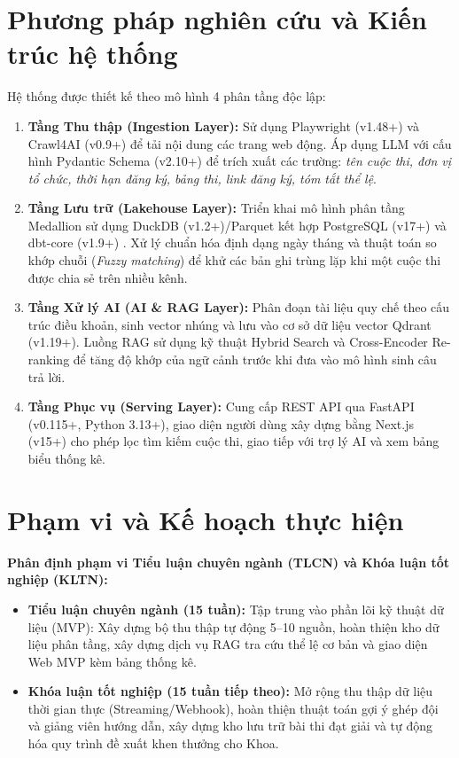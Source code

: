 \documentclass[11pt,a4paper]{article}
\begin{document}
\begin{enumerate}
\section{Phương pháp nghiên cứu và Kiến trúc hệ thống}
Hệ thống được thiết kế theo mô hình 4 phân tầng độc lập:
\begin{enumerate}
    \item \textbf{Tầng Thu thập (Ingestion Layer):} Sử dụng Playwright (v1.48+) và Crawl4AI (v0.9+) để tải nội dung các trang web động. Áp dụng LLM với cấu hình Pydantic Schema (v2.10+) để trích xuất các trường: \textit{tên cuộc thi, đơn vị tổ chức, thời hạn đăng ký, bảng thi, link đăng ký, tóm tắt thể lệ}.
    \item \textbf{Tầng Lưu trữ (Lakehouse Layer):} Triển khai mô hình phân tầng Medallion sử dụng DuckDB (v1.2+)/Parquet kết hợp PostgreSQL (v17+) và dbt-core (v1.9+) \cite{armbrust2021lakehouse}. Xử lý chuẩn hóa định dạng ngày tháng và thuật toán so khớp chuỗi (\textit{Fuzzy matching}) để khử các bản ghi trùng lặp khi một cuộc thi được chia sẻ trên nhiều kênh.
    \item \textbf{Tầng Xử lý AI (AI \& RAG Layer):} Phân đoạn tài liệu quy chế theo cấu trúc điều khoản, sinh vector nhúng và lưu vào cơ sở dữ liệu vector Qdrant (v1.19+). Luồng RAG sử dụng kỹ thuật Hybrid Search và Cross-Encoder Re-ranking để tăng độ khớp của ngữ cảnh trước khi đưa vào mô hình sinh câu trả lời.
    \item \textbf{Tầng Phục vụ (Serving Layer):} Cung cấp REST API qua FastAPI (v0.115+, Python 3.13+), giao diện người dùng xây dựng bằng Next.js (v15+) cho phép lọc tìm kiếm cuộc thi, giao tiếp với trợ lý AI và xem bảng biểu thống kê.
\end{enumerate}

\section{Phạm vi và Kế hoạch thực hiện}
\textbf{Phân định phạm vi Tiểu luận chuyên ngành (TLCN) và Khóa luận tốt nghiệp (KLTN):}
\begin{itemize}
    \item \textbf{Tiểu luận chuyên ngành (15 tuần):} Tập trung vào phần lõi kỹ thuật dữ liệu (MVP): Xây dựng bộ thu thập tự động 5--10 nguồn, hoàn thiện kho dữ liệu phân tầng, xây dựng dịch vụ RAG tra cứu thể lệ cơ bản và giao diện Web MVP kèm bảng thống kê.
    \item \textbf{Khóa luận tốt nghiệp (15 tuần tiếp theo):} Mở rộng thu thập dữ liệu thời gian thực (Streaming/Webhook), hoàn thiện thuật toán gợi ý ghép đội và giảng viên hướng dẫn, xây dựng kho lưu trữ bài thi đạt giải và tự động hóa quy trình đề xuất khen thưởng cho Khoa.
\end{itemize}


\end{enumerate}
\end{document}
